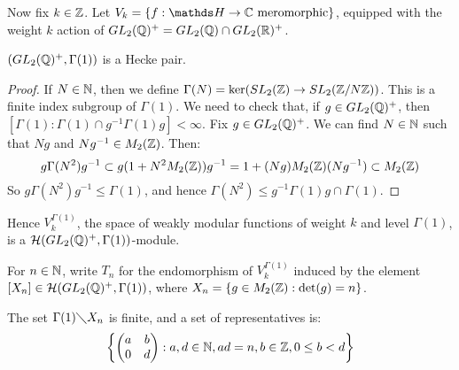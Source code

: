 \documentclass[10pt,a4paper]{article}
\begin{document}
Now fix $k \in \mathbb{Z}$. Let $V_k = \{f:\H \to \C \text{ meromorphic}\}$, equipped with the weight $k$ action of $GL_2(\mathbb{Q})^+ = GL_2(\mathbb{Q}) \cap GL_2(\mathbb{R})^+$.
\begin{lemma}
  $(GL_2(\mathbb{Q})^+, \Gamma(1))$ is a Hecke pair.
\end{lemma}
\begin{proof}
  If $N \in \mathbb{N}$, then we define $\Gamma(N) = \ker(SL_2(\mathbb{Z})\to SL_2(\mathbb{Z}/N\mathbb{Z}))$. This is a finite index subgroup of $\Gamma(1)$. We need to check that, if $g \in GL_2(\mathbb{Q})^+$, then $[\Gamma(1):\Gamma(1)\cap g^{-1}\Gamma(1)g]<\infty$.
  Fix $g \in GL_2(\mathbb{Q})^+$. We can find $N \in \mathbb{N}$ such that $Ng$ and $Ng^{-1} \in M_2(\mathbb{Z})$. Then:
  \[g\Gamma(N^2)g^{-1} \subset g(1+N^2 M_2(\mathbb{Z}))g^{-1} = 1+(Ng)M_2(\mathbb{Z})(Ng^{-1}) \subset M_2(\mathbb{Z})\]
  So $g \Gamma(N^2)g^{-1} \leq \Gamma(1)$, and hence $\Gamma(N^2) \leq g^{-1}\Gamma(1)g \cap \Gamma(1)$.
\end{proof}
Hence $V_k^{\Gamma(1)}$, the space of weakly modular functions of weight $k$ and level $\Gamma(1)$, is a $\mathcal{H}(GL_2(\mathbb{Q})^+, \Gamma(1))$-module.
\begin{definition}
  For $n \in \mathbb{N}$, write $T_n$ for the endomorphism of $V_k^{\Gamma(1)}$ induced by the element $[X_n] \in \mathcal{H}(GL_2(\mathbb{Q})^+, \Gamma(1))$, where $X_n = \{g \in M_2(\mathbb{Z}) : \det(g)=n\}$.
\end{definition}
\begin{lemma}
  The set $\Gamma(1)\diagdown X_n$ is finite, and a set of representatives is:
  \[\left\{\begin{pmatrix} a&b\\0& d \end{pmatrix}: a,d \in \mathbb{N}, ad = n, b \in \mathbb{Z}, 0\leq b < d\right\}\]
\end{lemma}
\end{document}
